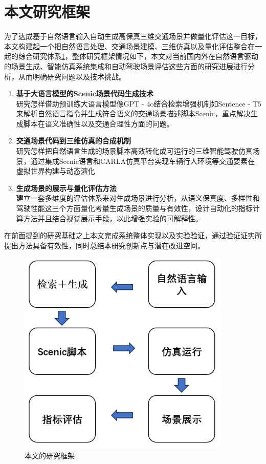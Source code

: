 \section{本文研究框架}

为了达成基于自然语言输入自动生成高保真三维交通场景并做量化评估这一目标，本文构建起一个把自然语言处理、交通场景建模\cite{du2025scene}、三维仿真以及量化评估整合在一起的综合研究体系\ref{fig:research_framework}，整体研究框架情况如下，本文对当前国内外在自然语言驱动的场景生成、智能仿真系统集成和自动驾驶场景评估这些方面的研究进展进行分析，从而明确研究问题以及技术挑战。

\begin{enumerate}
	\item \textbf{基于大语言模型的Scenic场景代码生成技术} \\
研究怎样借助预训练大语言模型像GPT - 4o结合检索增强机制如Sentence - T5来解析自然语言指令并生成符合语义的交通场景描述脚本Scenic，重点解决生成脚本在语义准确性以及交通合理性方面的问题。
	
	\item \textbf{交通场景代码到三维仿真的合成机制} \\
研究怎样把自然语言生成的场景脚本高效转化成可运行的三维智能驾驶仿真场景，通过集成Scenic语言和CARLA仿真平台实现车辆行人环境等交通要素在虚拟世界构建与动态演化
	
	\item \textbf{生成场景的展示与量化评估方法} \\
建立一套多维度的评估体系来对生成场景进行分析，从语义保真度、多样性和驾驶性能这三个方面量化考量生成场景的质量与有效性，设计自动化的指标计算方法并且结合视觉展示手段，以此增强实验的可解释性。
\end{enumerate}

在前面提到的研究基础之上本文完成系统整体实现以及实验验证，通过验证证实所提出方法具备有效性，同时总结本研究创新点与潜在改进空间。

\begin{figure}[H]
	\centering
	\includegraphics[width=0.9\textwidth]{../images/研究架构图.pdf} 
	\caption{本文的研究框架}
	\label{fig:research_framework}
\end{figure}